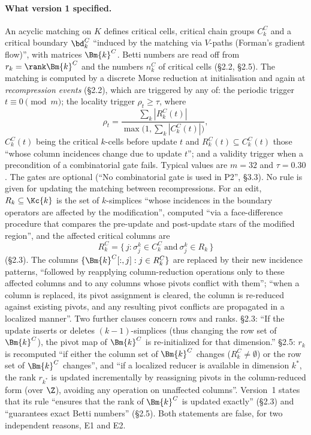 \paragraph{What version 1 specified.}
An acyclic matching on $K$ defines critical cells, critical chain groups
$C_k^C$ and a critical boundary $\bd_k^C$ ``induced by the matching via
$V$-paths (Forman's gradient flow)'', with matrices $\Bm{k}^C$. Betti numbers
are read off from $r_k=\rank\Bm{k}^C$ and the numbers $n_k^C$ of critical cells
(\S2.2, \S2.5). The matching is computed by a discrete Morse reduction at
initialisation and again at \emph{recompression events} (\S2.2), which are
triggered by any of: the periodic trigger $t\equiv0\pmod m$; the locality
trigger $\rho_t\ge\tau$, where
\[
  \rho_t=\frac{\sum_k|R_k^C(t)|}{\max\bigl(1,\sum_k|C_k^C(t)|\bigr)},
\]
$C_k^C(t)$ being the critical $k$-cells before update $t$ and
$R_k^C(t)\subseteq C_k^C(t)$ those ``whose column incidences change due to
update $t$''; and a validity trigger when a precondition of a combinatorial gate
fails. Typical values are $m=32$ and $\tau=0.30$. The gates are optional
(``No combinatorial gate is used in P2'', \S3.3). No rule is given for updating
the matching between recompressions. For an edit, $R_k\subseteq\Kc{k}$ is the set
of $k$-simplices ``whose incidences in the boundary operators are affected by
the modification'', computed ``via a face-difference procedure that compares
the pre-update and post-update stars of the modified region'', and the affected
critical columns are
\[
  R_k^C=\{\,j : \sigma_j^k\in C_k^C\ \text{and}\ \sigma_j^k\in R_k\,\}
\]
(\S2.3). The columns $\{\Bm{k}^C[:,j] : j\in R_k^C\}$ are replaced by their new
incidence patterns, ``followed by reapplying column-reduction operations only to
these affected columns and to any columns whose pivots conflict with them'';
``when a column is replaced, its pivot assignment is cleared, the column is
re-reduced against existing pivots, and any resulting pivot conflicts are
propagated in a localized manner''. Two further clauses concern rows and
ranks. \S2.3: ``If the update inserts or deletes $(k{-}1)$-simplices (thus
changing the row set of $\Bm{k}^C$), the pivot map of $\Bm{k}^C$ is
re-initialized for that dimension.'' \S2.5: $r_k$ is recomputed ``if either the
column set of $\Bm{k}^C$ changes ($R_k^C\ne\emptyset$) or the row set of
$\Bm{k}^C$ changes'', and ``if a localized reducer is available in dimension
$k^*$, the rank $r_{k^*}$ is updated incrementally by reassigning pivots in the
column-reduced form (over $\Z$), avoiding any operation on unaffected columns''.
Version~1 states that its rule ``ensures that the rank of $\Bm{k}^C$ is updated
exactly'' (\S2.3) and ``guarantees exact Betti numbers'' (\S2.5). Both
statements are false, for two independent reasons, E1 and E2.

